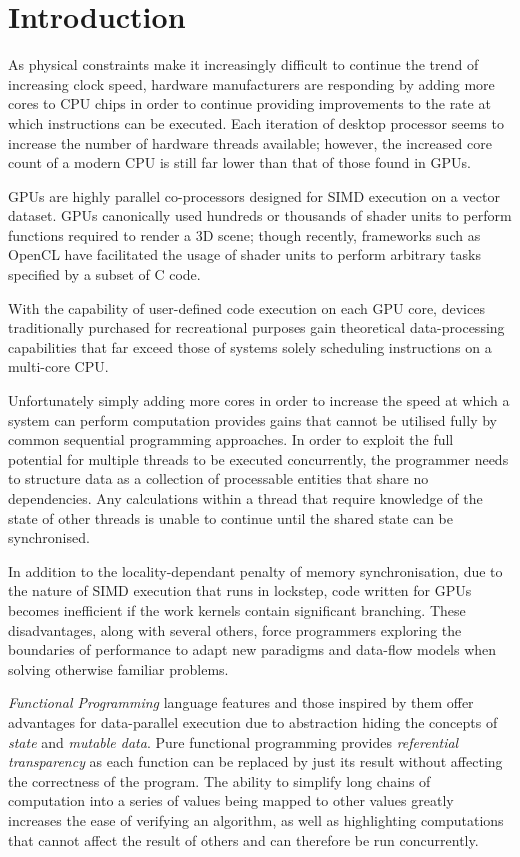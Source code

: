 \section{Introduction}
  As physical constraints make it increasingly difficult to continue the trend of increasing clock speed, hardware manufacturers are responding by adding more cores to \ac{CPU} chips in order to continue providing improvements to the rate at which instructions can be executed. \cite{perf}
  Each iteration of desktop processor seems to increase the number of hardware threads available; however, the increased core count of a modern \ac{CPU} is still far lower than that of those found in \ac{GPUs}.

\ac{GPUs} are highly parallel co-processors designed for \ac{SIMD} execution on a vector dataset.
\ac{GPUs} canonically used hundreds or thousands of shader units to perform functions required to render a 3D scene; though recently, frameworks such as \ac{OpenCL} have facilitated the usage of shader units to perform arbitrary tasks specified by a subset of C code.

 With the capability of user-defined code execution on each GPU core, devices traditionally purchased for recreational purposes gain theoretical data-processing capabilities that far exceed those of systems solely scheduling instructions on a multi-core \ac{CPU}.\cite{mars}

Unfortunately simply adding more cores in order to increase the speed at which a system can perform computation provides gains that cannot be utilised fully by common sequential programming approaches.
In order to exploit the full potential for multiple threads to be executed concurrently, the programmer needs to structure data as a collection of processable entities that share no dependencies.
Any calculations within a thread that require knowledge of the state of other threads is unable to continue until the shared state can be synchronised.

In addition to the locality-dependant penalty of memory synchronisation, due to the nature of \ac{SIMD} execution that runs in lockstep, code written for \ac{GPUs} becomes inefficient if the work kernels contain significant branching.
These disadvantages, along with several others, force programmers exploring the boundaries of performance to adapt new paradigms and data-flow models when solving otherwise familiar problems.

\emph{Functional Programming} language features and those inspired by them offer advantages for data-parallel execution due to abstraction hiding the concepts of \emph{state} and \emph{mutable data}.
Pure functional programming provides \emph{referential transparency} as each function can be replaced by just its result without affecting the correctness of the program.
The ability to simplify long chains of computation into a series of values being mapped to other values greatly increases the ease of verifying an algorithm, as well as highlighting computations that cannot affect the result of others and can therefore be run concurrently.

